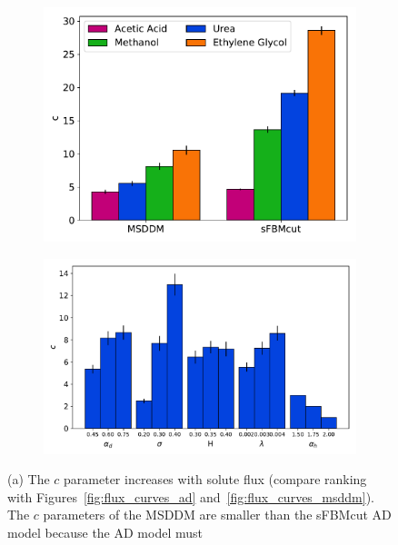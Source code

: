 \documentclass{article}
\begin{document}
  \begin{figure}
  \centering
  \begin{subfigure}{0.42\textwidth}
  \includegraphics[width=\textwidth]{c_parameter_comparison.pdf}
  \caption{}\label{fig:c_parameters}
  \end{subfigure}
  \begin{subfigure}{0.53\textwidth}
  \vspace{0.5em}
  \includegraphics[width=\textwidth]{c_influence.pdf}
  \caption{}\label{fig:c_influence}
  \end{subfigure}
  \caption{(a) The $c$ parameter increases with solute flux (compare ranking with
  Figures~\ref{fig:flux_curves_ad} and~\ref{fig:flux_curves_msddm}). The $c$ parameters
  of the MSDDM are smaller than the sFBMcut AD model because the AD model must
}
\end{figure}
\end{document}
